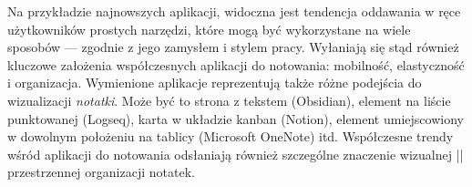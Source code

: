 Na przykładzie najnowszych aplikacji, widoczna jest tendencja oddawania w ręce użytkowników prostych narzędzi,
które mogą być wykorzystane na wiele sposobów — zgodnie z jego zamysłem i stylem pracy.
Wyłaniają się stąd również kluczowe założenia współczesnych aplikacji do notowania: mobilność, elastyczność i organizacja.
Wymienione aplikacje reprezentują także różne podejścia do wizualizacji \textit{notatki}.
Może być to strona z tekstem (Obsidian), element na liście punktowanej (Logseq), karta w układzie kanban (Notion),
element umiejscowiony w dowolnym położeniu na tablicy (Microsoft OneNote) itd.
Współczesne trendy wśród aplikacji do notowania odsłaniają również szczególne znaczenie wizualnej || przestrzennej organizacji notatek.